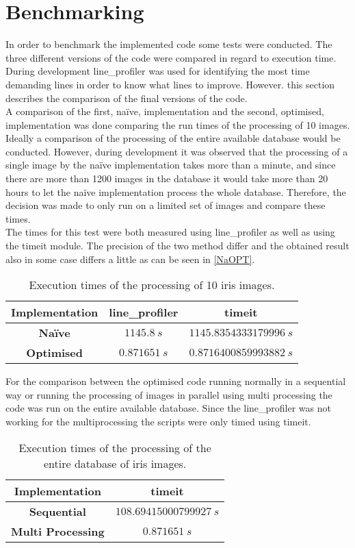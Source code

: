 \section{Benchmarking}
In order to benchmark the implemented code some tests were conducted. The three different versions of the code were compared in regard to execution time. During development line_profiler was used for identifying the most time demanding lines in order to know what lines to improve. However. this section describes the comparison of the final versions of the code.\\
A comparison of the first, na\"ive, implementation and the second, optimised, implementation was done comparing the run times of the processing of 10 images. Ideally a comparison of the processing of the entire available database would be conducted. However, during development it was observed that the processing of a single image by the na\"ive implementation takes more than a minute, and since there are more than 1200 images in the database it would take more than 20 hours to let the na\"ive implementation process the whole database. Therefore, the decision was made to only run on a limited set of images and compare these times. \\
The times for this test were both measured using line_profiler as well as using the timeit module. The precision of the two method differ and the obtained result also in some case differs a little as can be seen in \autoref{NaOPT}.  

\begin{table}[H]
\centering
\begin{tabular}{ |c|c|c| }
\hline
\textbf{Implementation}&\textbf{line_profiler}&\textbf{timeit} \\
\hline
\textbf{Na\"ive}&$1145.8~s$&$1145.8354333179996~s$\\
\hline
\textbf{Optimised}&$0.871651~s$&$0.8716400859993882~s$\\
\hline
\end{tabular}
\label{NaOPT}
\caption{Execution times of the processing of 10 iris images. }
\end{table}
\noindent
For the comparison between the optimised code running normally in a sequential way or running the processing of images in parallel using multi processing the code was run on the entire available database. Since the line_profiler was not working for the multiprocessing the scripts were only timed using timeit. 
\begin{table}[H]
\centering
\begin{tabular}{ |c|c| }
\hline
\textbf{Implementation}&\textbf{timeit} \\
\hline
\textbf{Sequential}&$108.69415000799927~s$\\
\hline
\textbf{Multi Processing}&$0.871651~s$\\
\hline
\end{tabular}
\label{SeqMu}
\caption{Execution times of the processing of the entire database of iris images. }
\end{table}
\noindent

     